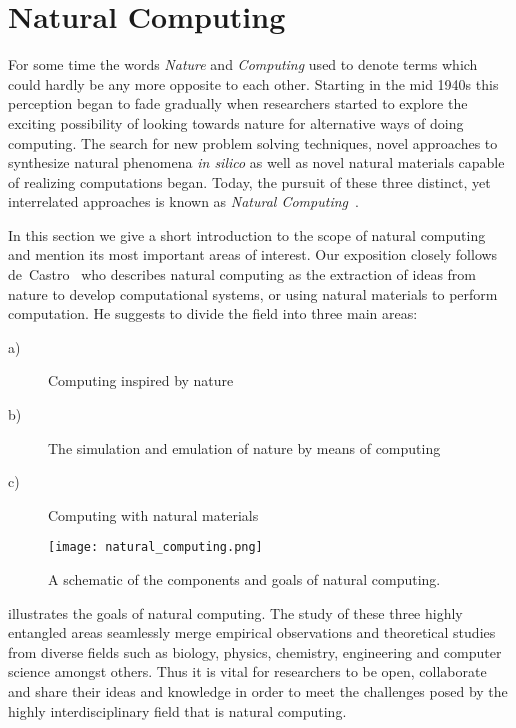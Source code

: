 \section{Natural Computing}\label{sec:natural_computing}

	For some time the words \emph{Nature} and \emph{Computing} used to denote terms which could hardly be any more opposite to each other. Starting in the mid 1940s this perception began to fade gradually when researchers started to explore the exciting possibility of looking towards nature for alternative ways of doing computing. The search for new problem solving techniques, novel approaches to synthesize natural phenomena \emph{in silico} as well as novel natural materials capable of realizing computations began. Today, the pursuit of these three distinct, yet interrelated approaches is known as \emph{Natural Computing}~\cite{de2005natural,de2006fundamentals}.

	In this section we give a short introduction to the scope of natural computing and mention its most important areas of interest. Our exposition closely follows de~Castro~\cite{de2007fundamentals} who describes natural computing as the extraction of ideas from nature to develop computational systems, or using natural materials to perform computation. He suggests to divide the field into three main areas:

	\begin{description}
		\item[a)] Computing inspired by nature
		\item[b)] The simulation and emulation of nature by means of computing
		\item[c)] Computing with natural materials
	\end{description}

	\begin{figure}
			\centering
			\texttt{[image: natural\_computing.png]}
			\caption[The goals of natural computing.]{A schematic of the components and goals of natural computing.}
			\label{fig:natural_computing}
	\end{figure}

	 illustrates the goals of natural computing. The study of these three highly entangled areas seamlessly merge empirical observations and theoretical studies from diverse fields such as biology, physics, chemistry, engineering and computer science amongst others. Thus it is vital for researchers to be open, collaborate and share their ideas and knowledge in order to meet the challenges posed by the highly interdisciplinary field that is natural computing.


